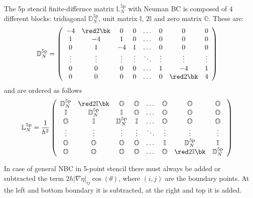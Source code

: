 The 5p stencil finite-differnce matrix $\mathbb{L}^{\mathrm{5p}}_N$ with Neuman BC is composed of 4 different blocks: tridiagonal $\mathbb{D}^{\mathrm{5p}}_{N}$, unit matrix $\mathbb{I}$, $2\mathbb{I}$ and zero matrix $\mathbb{O}$. These are:
\begin{align}
	\mathbb{D}^{\mathrm{5p}}_{N} &= \left(\begin{array}{ccccccccc}
		-4 & \red 2\bk & 0&0& \dots&0&0 &0\\
		1&-4&1&0&\dots&0&0& 0\\
		0&1&-4&1 &\dots&0&0&0\\
		\vdots&\vdots&\vdots&\vdots&\ddots &\vdots&\vdots&\vdots\\
		0&0&0&0&\dots &1&-4&1 \\
		0&0&0&0&\dots &0&\red 2\bk&4
	\end{array}\right) \\
\end{align}
and are ordered as follows
\begin{equation}
	\mathbb{L}^{\mathrm{5p}}_N = \frac{1}{h^2}\left(\begin{array}{cccccccccc}
		\mathbb{D}^{\mathrm{5p}}_{N} & \red 2\mathbb{I} \bk& \mathbb{O}&\mathbb{O}& \dots&\mathbb{O}&\mathbb{O} & \mathbb{O}\\
		\mathbb{I}&\mathbb{D}^{\mathrm{5p}}_{N} & \mathbb{I} & \mathbb{O}& \dots&\mathbb{O}&\mathbb{O}&\mathbb{O}\\
		\mathbb{O}&\mathbb{I}&\mathbb{D}^{\mathrm{5p}}_{N} & \mathbb{I} &  \dots&\mathbb{O}&\mathbb{O}&\mathbb{O}\\
		\vdots&\vdots&\vdots&\vdots&\ddots &\vdots&\vdots&\vdots\\
		\mathbb{O}&\mathbb{O}&\mathbb{O}&\mathbb{O}&\dots &\mathbb{I}&\mathbb{D}^{\mathrm{5p}}_{N} & \mathbb{I} \\
		\mathbb{O}&\mathbb{O}&\mathbb{O}&\mathbb{O}&\dots &\mathbb{O}&\red 2\mathbb{I}\bk&\mathbb{D}^{\mathrm{5p}}_{N}
	\end{array}\right)
\end{equation}    

In case of general NBC in 5-point stencil there must always be added or subtracted the term $2h|\nabla\eta|_{ij}\cos(\theta) $, where $(i,j)$ are the boundary points. At the left and bottom boundary it is subtracted, at the right and top it is added.

